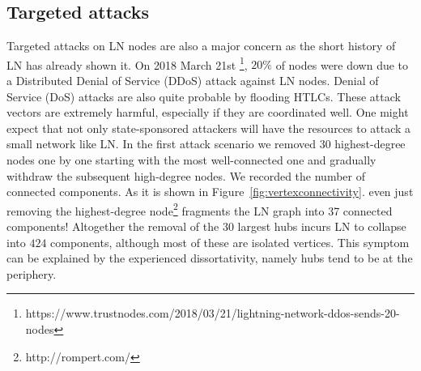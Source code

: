 \documentclass[a4paper]{article}
\theoremstyle{definition}
\begin{document}
\subsection{Targeted attacks}
Targeted attacks on LN nodes are also a major concern as the short history of LN has already shown it. On 2018 March 21st \footnote{https://www.trustnodes.com/2018/03/21/lightning-network-ddos-sends-20-nodes}, $20\%$ of nodes were down due to a Distributed Denial of Service (DDoS) attack against LN nodes. Denial of Service (DoS) attacks are also quite probable by flooding HTLCs. These attack vectors are extremely harmful, especially if they are coordinated well. One might expect that not only state-sponsored attackers will have the resources to attack a small network like LN. In the first attack scenario we removed 30 highest-degree nodes one by one starting with the most well-connected one and gradually withdraw the subsequent high-degree nodes. We recorded the number of connected components. As it is shown in Figure~\ref{fig:vertexconnectivity}. even just removing the highest-degree node\footnote{http://rompert.com/} fragments the LN graph into 37 connected components! Altogether the removal of the $30$ largest hubs incurs LN to collapse into $424$ components, although most of these are isolated vertices. This symptom can be explained by the experienced dissortativity, namely hubs tend to be at the periphery.     
\end{document}
